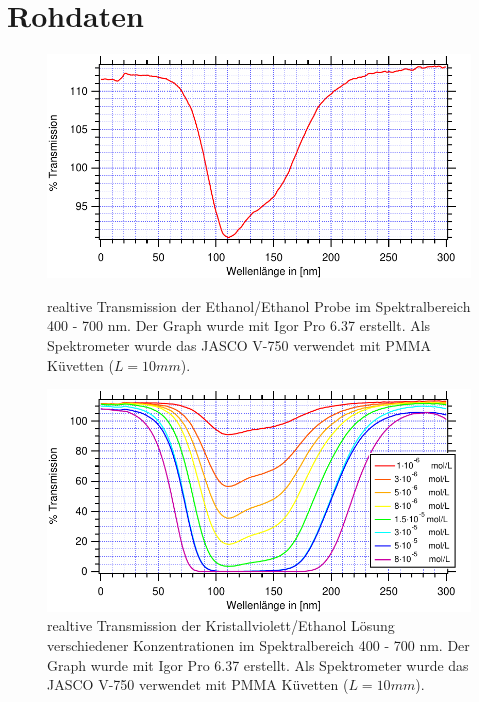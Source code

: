 %
%

\newpage
\section{Rohdaten}


\marginsize{2.5cm}{2.5cm}{2.5cm}{2.5cm}
\begin{figure}[H]
	\centering	
	\begin{minipage}{1\textwidth}
	\includegraphics[width=\columnwidth]{Rohdaten/Graph0.pdf}
	\caption{realtive Transmission der Ethanol/Ethanol Probe im Spektralbereich 400 - 700 nm. Der Graph wurde mit Igor Pro 6.37 erstellt. Als Spektrometer wurde das JASCO V-750 verwendet mit PMMA Küvetten ($L=10 \si{mm}$).} \label{fig:I_Leer}
	\end{minipage}
	\begin{minipage}{1\textwidth}
	\includegraphics[width=\columnwidth]{Rohdaten/alleTransmission.pdf}
	\caption{realtive Transmission der Kristallviolett/Ethanol Lösung verschiedener Konzentrationen im Spektralbereich 400 - 700 nm. Der Graph wurde mit Igor Pro 6.37 erstellt. Als Spektrometer wurde das JASCO V-750 verwendet mit PMMA Küvetten ($L=10 \si{mm}$).}
	\label{fig:I_alleTrans}
	\end{minipage}
\end{figure}



